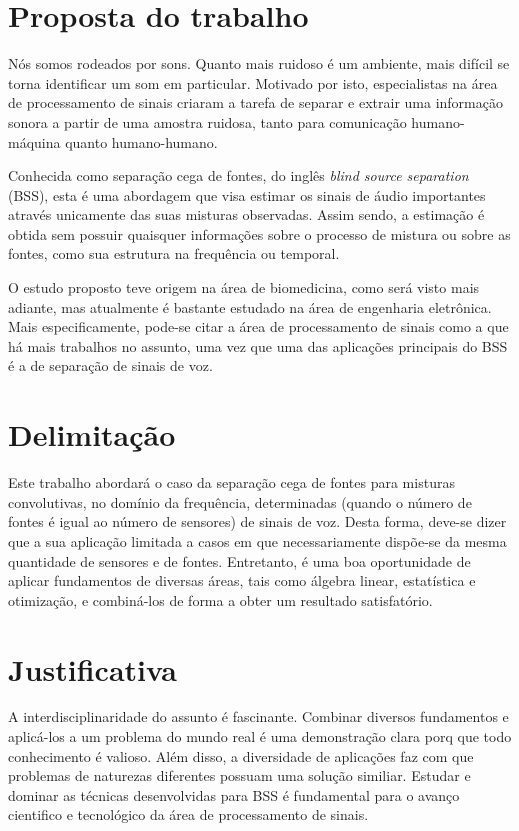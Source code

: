 \section{Proposta do trabalho}

Nós somos rodeados por sons. Quanto mais ruidoso é um ambiente, mais difícil se torna identificar um som em particular. Motivado por isto, especialistas na área de processamento de sinais criaram a tarefa de separar e extrair uma informação sonora a partir de uma amostra ruidosa, tanto para comunicação humano-máquina quanto humano-humano. 

Conhecida como separação cega de fontes, do inglês \textit{blind source separation} (BSS), esta é uma abordagem que visa estimar os sinais de áudio importantes através unicamente das suas misturas observadas. Assim sendo, a estimação é obtida sem possuir quaisquer informações sobre o processo de mistura ou sobre as fontes, como sua estrutura na frequência ou temporal.

O estudo proposto teve origem na área de biomedicina, como será visto mais adiante, mas atualmente é bastante estudado na área de engenharia eletrônica. Mais especificamente, pode-se citar a área de processamento de sinais como a que há mais trabalhos no assunto, uma vez que uma das aplicações principais do BSS é a de separação de sinais de voz.

\section{Delimitação}

Este trabalho abordará o caso da separação cega de fontes para misturas convolutivas, no domínio da frequência, determinadas (quando o número de fontes é igual ao número de sensores) de sinais de voz. Desta forma, deve-se dizer que a sua aplicação limitada a casos em que necessariamente dispõe-se da mesma quantidade de sensores e de fontes. Entretanto, é uma boa oportunidade de aplicar fundamentos de diversas áreas, tais como álgebra linear, estatística e otimização, e combiná-los de forma a obter um resultado satisfatório.


\section{Justificativa}

A interdisciplinaridade do assunto é fascinante. Combinar diversos fundamentos e aplicá-los a um problema do mundo real é uma demonstração clara porq que todo conhecimento é valioso. Além disso, a diversidade de aplicações faz com que problemas de naturezas diferentes possuam uma solução similiar. Estudar e dominar as técnicas desenvolvidas para BSS é fundamental para o avanço cientifico e tecnológico da área de processamento de sinais.


